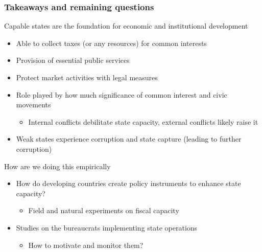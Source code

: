 \documentclass[aspectratio=169]{beamer}
\begin{document}
\begin{frame}
\frametitle{Takeaways and remaining questions} 
Capable states are the foundation for economic and institutional development
\begin{itemize}\setlength\itemsep{3pt}
\item Able to collect taxes (or any resources) for common interests
\item Provision of essential public services
\item Protect market activities with legal measures
\item Role played by how much significance of common interest and civic movements 
\begin{itemize}
  \item Internal conflicts debilitate state capacity, external conflicts likely raise it
\end{itemize}
\item Weak states experience corruption and state capture (leading to further corruption)
\end{itemize}\medskip
How are we doing this empirically
\begin{itemize}\setlength\itemsep{3pt}
\item How do developing countries create policy instruments to enhance state capacity?
 \begin{itemize}
  \item Field and natural experiments on fiscal capacity
\end{itemize}
\item Studies on the bureaucrats implementing state operations
 \begin{itemize}
  \item How to motivate and monitor them?
\end{itemize}
\end{itemize}\medskip
\end{frame}


\end{document}
